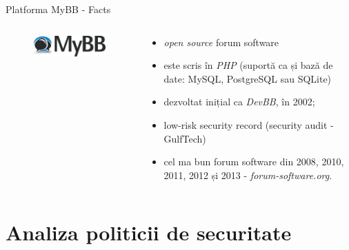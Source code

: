 \documentclass[9pt]{beamer}
\begin{document}
\begin{frame}{Platforma MyBB - Facts}
  \begin{columns}
    \begin{column}[c]{0.30\textwidth}
      \begin{figure}
        \includegraphics[scale=0.4]{figures/mybb}
      \end{figure}
    \end{column}
    \begin{column}[c]{0.70\textwidth}
        \begin{itemize}
		\vskip10pt
		\item \textit{open source} forum software
		\vskip10pt
		\item este scris în \textit{PHP} (suportă ca și bază de date: MySQL, PostgreSQL sau SQLite)
		\vskip10pt
		\item dezvoltat inițial ca \textit{DevBB}, în 2002;
		\vskip10pt
		\item low-risk security record (security audit - GulfTech)
		\vskip10pt
		\item cel ma bun forum software din 2008, 2010, 2011, 2012 și 2013 - \textit{forum-software.org}.
	\end{itemize}
    \end{column}
  \end{columns}
\end{frame}

\section[]{Analiza politicii de securitate}
\end{document}
